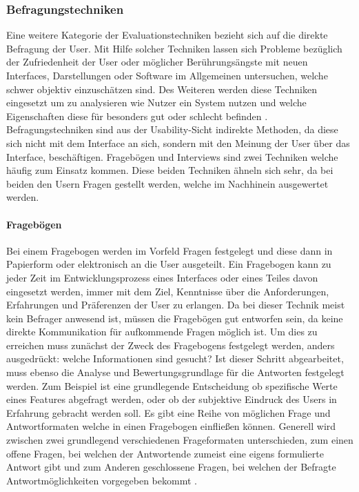 \documentclass[draft=false
              ,paper=a4
              ,twoside=false
              ,fontsize=11pt
              ,headsepline
              ,BCOR10mm
              ,DIV11
              ]{scrbook}
\begin{document}
\subsubsection{Befragungstechniken} %
\label{ssub:befragungstechniken}
Eine weitere Kategorie der Evaluationstechniken bezieht sich auf die direkte Befragung der User. Mit Hilfe solcher Techniken lassen sich Probleme bezüglich der Zufriedenheit der User oder möglicher Berührungsängste mit neuen Interfaces, Darstellungen oder Software im Allgemeinen untersuchen, welche schwer objektiv einzuschätzen sind. Des Weiteren werden diese Techniken eingesetzt um zu analysieren wie Nutzer ein System nutzen und welche Eigenschaften diese für besonders gut oder schlecht befinden \cite{nielsen_usability_1994}. Befragungstechniken sind aus der Usability-Sicht indirekte Methoden, da diese sich nicht mit dem Interface an sich, sondern mit den Meinung der User über das Interface, beschäftigen. Fragebögen und Interviews sind zwei Techniken welche häufig zum Einsatz kommen. Diese beiden Techniken ähneln sich sehr, da bei beiden den Usern Fragen gestellt werden, welche im Nachhinein ausgewertet werden. 

\paragraph{Fragebögen} %
\label{par:fragebögen}
Bei einem Fragebogen werden im Vorfeld Fragen festgelegt und diese dann in Papierform oder elektronisch an die User ausgeteilt. Ein Fragebogen kann zu jeder Zeit im Entwicklungsprozess eines Interfaces oder eines Teiles davon eingesetzt werden, immer mit dem Ziel, Kenntnisse über die Anforderungen, Erfahrungen und Präferenzen der User zu erlangen. Da bei dieser Technik meist kein Befrager anwesend ist, müssen die Fragebögen gut entworfen sein, da keine direkte Kommunikation für aufkommende Fragen möglich ist. Um dies zu erreichen muss zunächst der Zweck des Fragebogens festgelegt werden, anders ausgedrückt: welche Informationen sind gesucht? Ist dieser Schritt abgearbeitet, muss ebenso die Analyse und Bewertungsgrundlage für die Antworten festgelegt werden. Zum Beispiel ist eine grundlegende Entscheidung ob spezifische Werte eines Features abgefragt werden, oder ob der subjektive Eindruck des Users in Erfahrung gebracht werden soll.
Es gibt eine Reihe von möglichen Frage und Antwortformaten welche in einen Fragebogen einfließen können. Generell wird zwischen zwei grundlegend verschiedenen Frageformaten unterschieden, zum einen offene Fragen, bei welchen der Antwortende zumeist eine eigens formulierte Antwort gibt und zum Anderen geschlossene Fragen, bei welchen der Befragte Antwortmöglichkeiten vorgegeben bekommt \cite{ader_advising_2008}.
\end{document}
